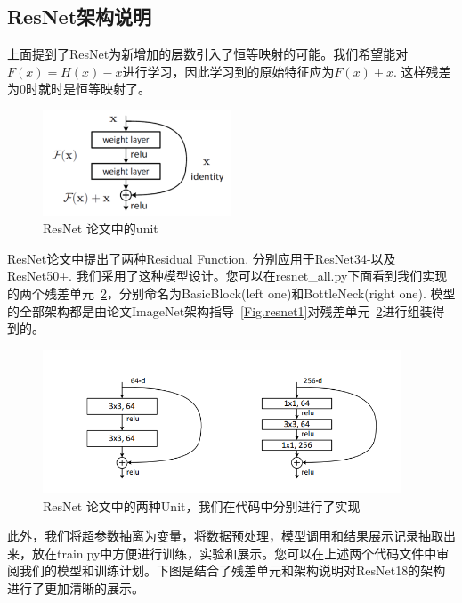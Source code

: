 \documentclass[hyperref, UTF8, 12pt]{article}
\theoremstyle{definition}
\begin{document}
\subsection{ResNet架构说明}
上面提到了ResNet为新增加的层数引入了恒等映射的可能。我们希望能对$F(x) = H(x) - x$进行学习，因此学习到的原始特征应为$F(x) + x$. 这样残差为0时就时是恒等映射了。\\
\begin{figure}[h] %
	\centering %
	\includegraphics[width=0.5\textwidth]{resnetUnit.png} %
	\caption{ResNet 论文中的unit} %
	\label{Fig.resnet2} %
\end{figure}
\indent
ResNet论文中提出了两种Residual Function. 分别应用于ResNet34-以及ResNet50+. 我们采用了这种模型设计。您可以在resnet\_all.py下面看到我们实现的两个残差单元~\ref{Fig.resnet4}，分别命名为BasicBlock(left one)和BottleNeck(right one). 模型的全部架构都是由论文ImageNet架构指导~\ref{Fig.resnet1}对残差单元~\ref{Fig.resnet4}进行组装得到的。\\
\begin{figure}[h] %
	\centering %
	\includegraphics[width=0.95\textwidth]{resnet2units.png} %
	\caption{ResNet 论文中的两种Unit，我们在代码中分别进行了实现} %
	\label{Fig.resnet4} %
\end{figure}
\indent
此外，我们将超参数抽离为变量，将数据预处理，模型调用和结果展示记录抽取出来，放在train.py中方便进行训练，实验和展示。您可以在上述两个代码文件中审阅我们的模型和训练计划。下图是结合了残差单元和架构说明对ResNet18的架构进行了更加清晰的展示。
\end{document}
